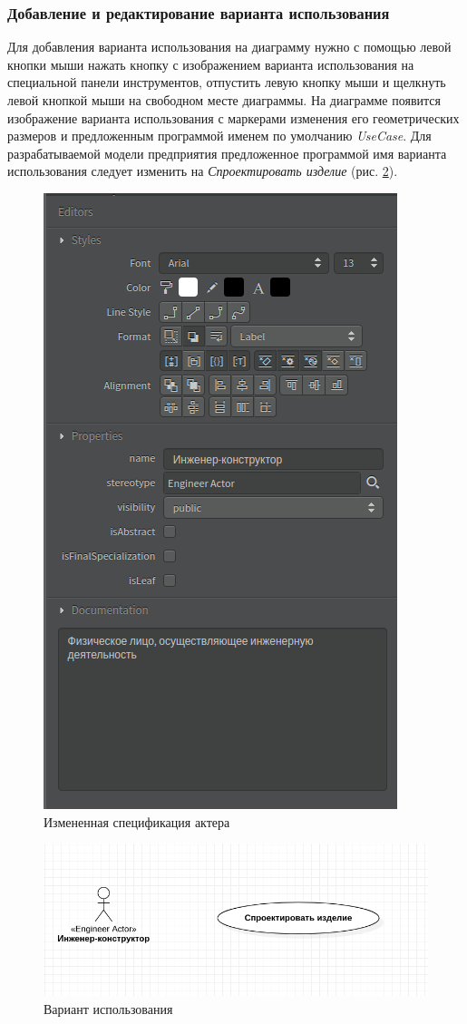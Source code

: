 \documentclass[a4paper,12pt]{report}
\begin{document}
\subsubsection{Добавление и редактирование варианта использования}
Для добавления варианта использования на диаграмму нужно с помощью левой кнопки мыши нажать кнопку с изображением варианта использования на специальной панели инструментов, отпустить левую кнопку мыши и щелкнуть левой кнопкой мыши на свободном месте диаграммы. На диаграмме появится изображение варианта использования с маркерами изменения его геометрических размеров и предложенным программой именем по умолчанию \textit{UseCase}. Для разрабатываемой модели предприятия предложенное программой имя варианта использования следует изменить на \textit{Спроектировать изделие} (рис. \ref{fig:usecaseproectdaction}).
\newpage
\begin{figure}[h!]
	\centering
	\includegraphics[width=0.35\linewidth]{images/actor1editors2}
	\caption{Измененная спецификация актера}
	\label{fig:actor1editors2}
\end{figure}

\begin{figure}[h!]
	\centering
	\includegraphics[width=0.8\linewidth]{images/usecaseproectdaction}
	\caption{Вариант использования}
	\label{fig:usecaseproectdaction}
\end{figure}
\end{document}
